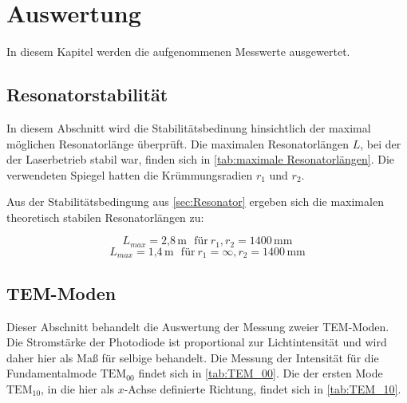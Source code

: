 


\section{Auswertung}
\label{sec:auswertung}

In diesem Kapitel werden die aufgenommenen Messwerte ausgewertet.





\subsection{Resonatorstabilität}
\label{sec:resonatorstabilität}


In diesem Abschnitt wird die Stabilitätsbedinung hinsichtlich der maximal möglichen Resonatorlänge überprüft.
Die maximalen Resonatorlängen $L$, bei der der Laserbetrieb stabil war, finden sich in \autoref{tab:maximale Resonatorlängen}. 
Die verwendeten Spiegel hatten die Krümmungsradien $r_1$ und $r_2$.





Aus der Stabilitätsbedingung aus \autoref{sec:Resonator} ergeben sich die maximalen theoretisch stabilen Resonatorlängen zu:

\begin{equation}
L_{max} = \text{2,8}\,\text{m} \ \ \ \text{für}\  r_1, r_2 = 1400\,\text{mm}
\label{eq:Lmax1}
\end{equation}
\begin{equation}
L_{max} = \text{1,4}\,\text{m} \ \ \ \text{für}\  r_1 = \infty, r_2 = 1400\,\text{mm}
\label{eq:Lmax2}
\end{equation}









\subsection{TEM-Moden}
\label{sec:TEM-Moden}

Dieser Abschnitt behandelt die Auswertung der Messung zweier TEM-Moden.
Die Stromstärke der Photodiode ist proportional zur Lichtintensität und wird daher hier als Maß für selbige behandelt. Die Messung der Intensität für die Fundamentalmode $\text{TEM}_{00}$ findet sich in \autoref{tab:TEM_00}. Die der ersten Mode $\text{TEM}_{10}$, in die hier als $x$-Achse definierte Richtung, findet sich in \autoref{tab:TEM_10}.



